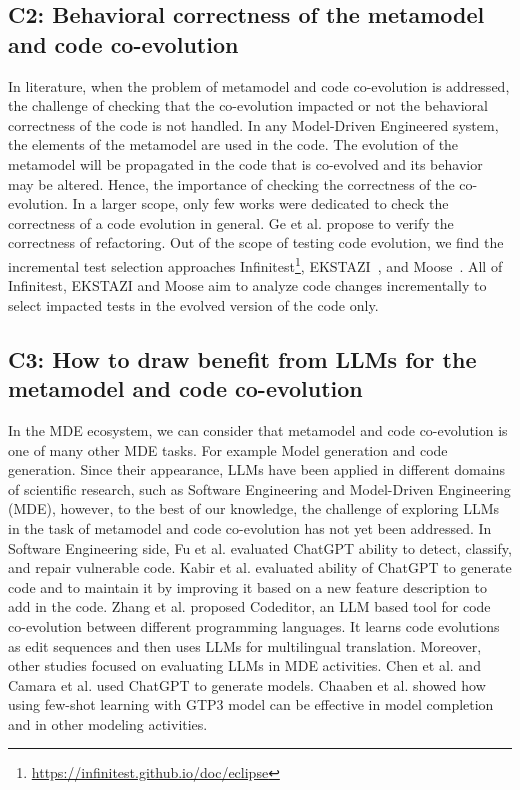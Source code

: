  

\subsection*{C2: Behavioral correctness of the metamodel and code co-evolution}
\label{C2}
In literature, when the problem of metamodel and code co-evolution is addressed, the challenge of checking that the co-evolution impacted or not the behavioral correctness of the code is not handled. In any Model-Driven Engineered system, the elements of the metamodel are used in the code. The evolution of the metamodel will be propagated in the code that is co-evolved and its behavior may be altered. Hence, the importance of checking the correctness of the co-evolution. In a larger scope, only few works were dedicated to check the correctness of a code evolution in general. %
 Ge et al. \cite{10.1145/2568225.2568280} propose to verify the correctness of refactoring.
Out of the scope of testing code evolution, we find the incremental test selection approaches Infinitest\footnote{\url{https://infinitest.github.io/doc/eclipse}}, EKSTAZI~\cite{7203050}, and Moose~\cite{ducasse2000moose}. All of Infinitest, EKSTAZI and Moose aim to analyze code changes incrementally to select impacted tests in the evolved version of the code only.

\subsection*{C3: How to draw benefit from LLMs for the metamodel and code co-evolution}
\label{C3}
In the MDE ecosystem, we can consider that metamodel and code co-evolution is one of many other MDE tasks. For example Model generation and code generation. Since their appearance, LLMs have been applied in different domains of scientific research, such as Software Engineering and Model-Driven Engineering (MDE), however, to the best of our knowledge, the challenge of exploring LLMs in the task of metamodel and code co-evolution has not yet been addressed. In Software Engineering side, Fu et al. \cite{fu2023chatgpt} evaluated ChatGPT ability to detect, classify, and repair vulnerable code. Kabir et al. \cite{kabir2023empirical} evaluated ability of ChatGPT to generate code and to maintain it by improving it based on a new feature description to add in the code. Zhang et al. \cite{zhang2023multilingual} proposed Codeditor, an LLM based tool for code co-evolution between different programming languages. It learns code evolutions as edit sequences and then uses LLMs for multilingual translation.
Moreover, other studies focused on evaluating LLMs in MDE activities. 
Chen et al. \cite{10344012} and Camara et al. \cite{camara2023assessment} used ChatGPT to generate models.
Chaaben et al. \cite{chaaben2023towards} showed how using few-shot learning with GTP3 model can be effective in model completion and in other modeling activities. 
%
